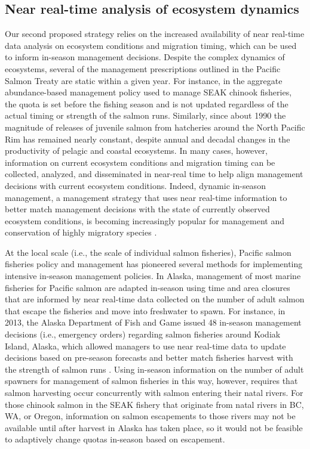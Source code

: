 \subsection{Near real-time analysis of ecosystem dynamics}

Our second proposed strategy relies on the increased availability of near
real-time data analysis on ecosystem conditions and migration timing, which can
be used to inform in-season management decisions. Despite the complex dynamics
of ecosystems, several of the management prescriptions outlined in the Pacific
Salmon Treaty are static within a given year. For instance, in the aggregate
abundance-based management policy used to manage SEAK chinook fisheries, the
quota is set before the fishing season and is not updated regardless of the
actual timing or strength of the salmon runs. Similarly, since about 1990 the
magnitude of releases of juvenile salmon from hatcheries around the North
Pacific Rim has remained nearly constant, despite annual and decadal changes in
the productivity of pelagic and coastal ecosystems. In many cases, however,
information on current ecosystem conditions and migration timing can be
collected, analyzed, and disseminated in near-real time to help align management
decisions with current ecosystem conditions. Indeed, dynamic in-season
management, a management strategy that uses near real-time information to better
match management decisions with the state of currently observed ecosystem
conditions, is becoming increasingly popular for management and conservation of
highly migratory species \citep{Maxwell2015, Lewison2015}.

At the local scale (i.e., the scale of individual salmon fisheries), Pacific
salmon fisheries policy and management has pioneered several methods for
implementing intensive in-season management policies. In Alaska, management of
most marine fisheries for Pacific salmon are adapted in-season using time and
area closures that are informed by near real-time data collected on the number
of adult salmon that escape the fisheries and move into freshwater to spawn. For
instance, in 2013, the Alaska Department of Fish and Game issued 48 in-season
management decisions (i.e., emergency orders) regarding salmon fisheries around
Kodiak Island, Alaska, which allowed managers to use near real-time data to update
decisions based on pre-season forecasts and better match fisheries harvest with
the strength of salmon runs \citep{Jackson2013}. Using in-season information on
the number of adult spawners for management of salmon fisheries in this way,
however, requires that salmon harvesting occur concurrently with salmon entering
their natal rivers. For those chinook salmon in the SEAK fishery that originate
from natal rivers in BC, WA, or Oregon, information on salmon escapements to
those rivers may not be available until after harvest in Alaska has taken place,
so it would not be feasible to adaptively change quotas in-season based on
escapement.

